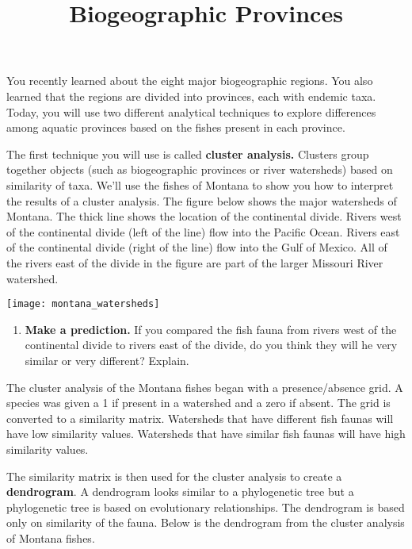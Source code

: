 \documentclass[11pt]{article}
\title{Biogeographic Provinces}
\author{}
\date{}                                           %
\begin{document}
\maketitle
\thispagestyle{empty}

You recently learned about the eight major biogeographic regions. 
You also learned that the regions are divided into provinces, each with
endemic taxa.  Today, you will use two different analytical techniques to explore 
differences among aquatic provinces based on the fishes present in each 
province.

The first technique you will use is called \textbf{cluster analysis.} Clusters
group together objects (such as biogeographic provinces or river watersheds)
based on similarity of taxa. We'll use the fishes of Montana to show you
how to interpret the results of a cluster analysis.  The figure below shows the
major watersheds of Montana.  The thick line shows the location of the
continental divide. Rivers west of the continental divide (left of the line)
flow into the Pacific Ocean. Rivers east of the continental divide (right
of the line) flow into the Gulf of Mexico.  All of the rivers east of the divide
in the figure are part of the larger Missouri River watershed.

\begin{center}
	\texttt{[image: montana\_watersheds]}
\end{center}

\begin{enumerate}[leftmargin=*]
\item \textbf{Make a prediction.} If you compared the fish fauna from 
rivers west of the continental divide  to rivers east of the divide, do you think
they will he very similar or very different? Explain.\vspace{8\baselineskip}
\end{enumerate}

The cluster analysis of the Montana fishes began with a presence/absence
grid. A species was given a 1 if present in a watershed and a zero if absent. 
The grid is converted to a similarity matrix. Watersheds that have different
fish faunas will have low similarity values. Watersheds that have similar fish 
faunas will have high similarity values.  

The similarity matrix is then used for the cluster analysis to create a \textbf{dendrogram}.
A dendrogram looks similar to a phylogenetic tree but a phylogenetic tree is
based on evolutionary relationships. The dendrogram is based only on similarity
of the fauna. Below is the dendrogram from the cluster analysis of Montana fishes.
\end{document}
